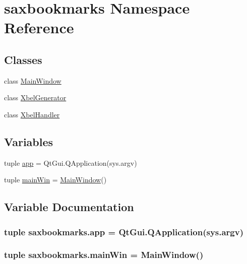 \hypertarget{namespacesaxbookmarks}{}\section{saxbookmarks Namespace Reference}
\label{namespacesaxbookmarks}
\subsection*{Classes}
\begin{DoxyCompactItemize}
\item 
class \hyperlink{classsaxbookmarks_1_1MainWindow}{Main\+Window}
\item 
class \hyperlink{classsaxbookmarks_1_1XbelGenerator}{Xbel\+Generator}
\item 
class \hyperlink{classsaxbookmarks_1_1XbelHandler}{Xbel\+Handler}
\end{DoxyCompactItemize}
\subsection*{Variables}
\begin{DoxyCompactItemize}
\item 
tuple \hyperlink{namespacesaxbookmarks_ad4dab7ab47b48bf81ec9112d7c8a9304}{app} = Qt\+Gui.\+Q\+Application(sys.\+argv)
\item 
tuple \hyperlink{namespacesaxbookmarks_a72566befdc1b6d47d7510da93f5a2219}{main\+Win} = \hyperlink{classsaxbookmarks_1_1MainWindow}{Main\+Window}()
\end{DoxyCompactItemize}


\subsection{Variable Documentation}
\hypertarget{namespacesaxbookmarks_ad4dab7ab47b48bf81ec9112d7c8a9304}{}
\subsubsection[{app}]{\setlength{\rightskip}{0pt plus 5cm}tuple saxbookmarks.\+app = Qt\+Gui.\+Q\+Application(sys.\+argv)}\label{namespacesaxbookmarks_ad4dab7ab47b48bf81ec9112d7c8a9304}
\hypertarget{namespacesaxbookmarks_a72566befdc1b6d47d7510da93f5a2219}{}
\subsubsection[{main\+Win}]{\setlength{\rightskip}{0pt plus 5cm}tuple saxbookmarks.\+main\+Win = {\bf Main\+Window}()}\label{namespacesaxbookmarks_a72566befdc1b6d47d7510da93f5a2219}
